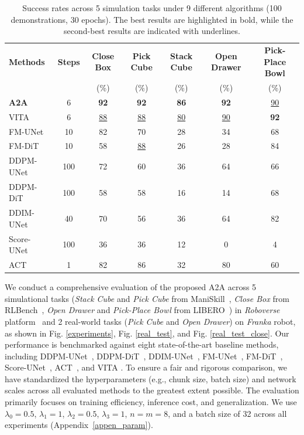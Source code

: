 \documentclass[onecolumn]{fairmeta}
\newcommand{\m}[1]{{A2A}}
\begin{document}
	\begin{table}[ht]
		\caption{Success rates across 5 simulation tasks under 9 different algorithms (100 demonstrations, 30 epochs). The best results are highlighted in {bold}, while the second-best results are indicated with {underlines}.}
		\label{tab-30epochs}
		\centering
		\small
		\setlength{\tabcolsep}{3.5pt} 
		\begin{tabular}{lcccccc}
			\toprule
			\textbf{Methods} & \textbf{Steps} & \textbf{Close Box} & \textbf{Pick Cube} & \textbf{Stack Cube} & \textbf{Open Drawer} & \textbf{Pick-Place Bowl} \\
			& & (\%) & (\%) & (\%) & (\%) & (\%) \\
			\midrule
			\textbf{\m{}} & 6 & \textbf{92} & \textbf{92} & \textbf{86} & \textbf{92} & \underline{90} \\
			VITA                & 6 & \underline{88} & \underline{88} & \underline{80} & \underline{90} & \textbf{92} \\
			FM-UNet             & 10 & 82 & 70 & 28 & 34 & 68 \\
			FM-DiT              & 10 & 58 & \underline{88} & 26 & 28 & 84 \\
			DDPM-UNet           & 100 & 72 & 60 & 36 & 64 & 66 \\
			DDPM-DiT            & 100 & 58 & 58 & 16 & 14 & 68 \\
			DDIM-UNet           & 40 & 70 & 56 & 36 & 64 & 82 \\
			Score-UNet          & 100 & 36 & 36 & 12 & 0 & 4 \\
			ACT                 & 1 & 82 & 86 & 32 & 80 & 60 \\
			\bottomrule
		\end{tabular}
	\end{table}
	
	We conduct a comprehensive evaluation of the proposed \m{} across 5 simulational tasks (\textit{Stack Cube} and \textit{Pick Cube} from ManiSkill~\citep{mu2021maniskill}, \textit{Close Box} from RLBench~\citep{james2020rlbench}, \textit{Open Drawer} and \textit{Pick-Place Bowl} from LIBERO~\citep{liu2023libero}) in \textit{Roboverse} platform~\citep{geng2025roboverse} and 2 real-world tasks (\textit{Pick Cube} and \textit{Open Drawer}) on \textit{Franka} robot, as shown in Fig. \ref{experiments}, Fig. \ref{real_test}, and Fig. \ref{real_test_close}. Our performance is benchmarked against eight state-of-the-art baseline methods, including DDPM-UNet~\citep{dp, ddpm}, DDPM-DiT~\citep{ddpm, Peebles_2023_ICCV}, DDIM-UNet~\citep{dp, song2020denoising}, FM-UNet~\citep{flowmatching}, FM-DiT~\citep{flowmatching, Peebles_2023_ICCV}, Score-UNet~\citep{song2020score}, ACT~\citep{zhao2023learning}, and VITA \citep{gao2025vita}. To ensure a fair and rigorous comparison, we have standardized the hyperparameters (e.g., chunk size, batch size) and network scales across all evaluated methods to the greatest extent possible. The evaluation primarily focuses on training efficiency, inference cost, and generalization. We use $\lambda_0 = 0.5$, $\lambda_1 = 1$, $\lambda_2 = 0.5$, $\lambda_3 = 1$, $n = m = 8$, and a batch size of 32 across all experiments (Appendix~\ref{appen_param}).
	
\end{document}

